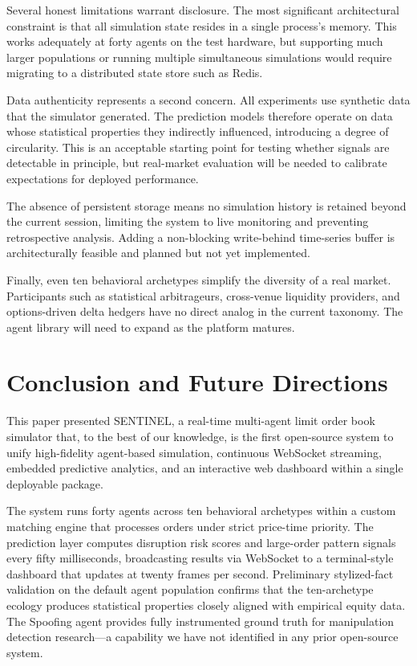 \documentclass[conference]{IEEEtran}
\begin{document}
Several honest limitations warrant disclosure. The most significant
architectural constraint is that all simulation state resides in a
single process's memory. This works adequately at forty agents on
the test hardware, but supporting much larger populations or running
multiple simultaneous simulations would require migrating to a
distributed state store such as Redis.

Data authenticity represents a second concern. All experiments use
synthetic data that the simulator generated. The prediction models
therefore operate on data whose statistical properties they
indirectly influenced, introducing a degree of circularity. This is
an acceptable starting point for testing whether signals are
detectable in principle, but real-market evaluation will be needed to
calibrate expectations for deployed performance.

The absence of persistent storage means no simulation history is
retained beyond the current session, limiting the system to live
monitoring and preventing retrospective analysis. Adding a
non-blocking write-behind time-series buffer is architecturally
feasible and planned but not yet implemented.

Finally, even ten behavioral archetypes simplify the diversity of a
real market. Participants such as statistical arbitrageurs,
cross-venue liquidity providers, and options-driven delta hedgers have
no direct analog in the current taxonomy. The agent library will
need to expand as the platform matures.


\section{Conclusion and Future Directions}

This paper presented SENTINEL, a real-time multi-agent limit order
book simulator that, to the best of our knowledge, is the first
open-source system to unify high-fidelity agent-based simulation,
continuous WebSocket streaming, embedded predictive analytics, and an
interactive web dashboard within a single deployable package.

The system runs forty agents across ten behavioral archetypes within a
custom matching engine that processes orders under strict price-time
priority. The prediction layer computes disruption risk scores and
large-order pattern signals every fifty milliseconds, broadcasting
results via WebSocket to a terminal-style dashboard that updates at
twenty frames per second. Preliminary stylized-fact validation on the
default agent population confirms that the ten-archetype ecology
produces statistical properties closely aligned with empirical equity
data. The Spoofing agent provides fully instrumented ground truth for
manipulation detection research---a capability we have not identified
in any prior open-source system.
\end{document}
